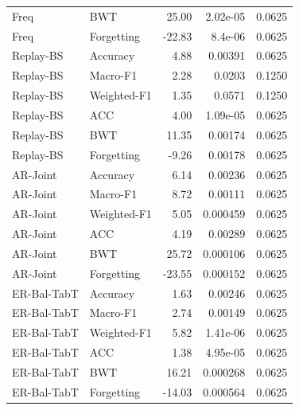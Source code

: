\begin{table}[t]
\begin{tabular}{llrrr}
Freq & BWT & 25.00 & 2.02e-05 & 0.0625 \\
Freq & Forgetting & -22.83 & 8.4e-06 & 0.0625 \\
Replay-BS & Accuracy & 4.88 & 0.00391 & 0.0625 \\
Replay-BS & Macro-F1 & 2.28 & 0.0203 & 0.1250 \\
Replay-BS & Weighted-F1 & 1.35 & 0.0571 & 0.1250 \\
Replay-BS & ACC & 4.00 & 1.09e-05 & 0.0625 \\
Replay-BS & BWT & 11.35 & 0.00174 & 0.0625 \\
Replay-BS & Forgetting & -9.26 & 0.00178 & 0.0625 \\
AR-Joint & Accuracy & 6.14 & 0.00236 & 0.0625 \\
AR-Joint & Macro-F1 & 8.72 & 0.00111 & 0.0625 \\
AR-Joint & Weighted-F1 & 5.05 & 0.000459 & 0.0625 \\
AR-Joint & ACC & 4.19 & 0.00289 & 0.0625 \\
AR-Joint & BWT & 25.72 & 0.000106 & 0.0625 \\
AR-Joint & Forgetting & -23.55 & 0.000152 & 0.0625 \\
ER-Bal-TabT & Accuracy & 1.63 & 0.00246 & 0.0625 \\
ER-Bal-TabT & Macro-F1 & 2.74 & 0.00149 & 0.0625 \\
ER-Bal-TabT & Weighted-F1 & 5.82 & 1.41e-06 & 0.0625 \\
ER-Bal-TabT & ACC & 1.38 & 4.95e-05 & 0.0625 \\
ER-Bal-TabT & BWT & 16.21 & 0.000268 & 0.0625 \\
ER-Bal-TabT & Forgetting & -14.03 & 0.000564 & 0.0625 \\
\bottomrule\end{tabular}\end{table}
